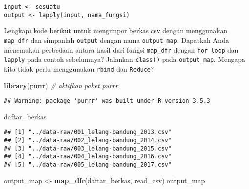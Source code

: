 \documentclass[]{article}
\newenvironment{Shaded}{\begin{snugshade}}{\end{snugshade}}
\newcommand{\CommentTok}[1]{\textcolor[rgb]{0.56,0.35,0.01}{\textit{#1}}}
\newcommand{\KeywordTok}[1]{\textcolor[rgb]{0.13,0.29,0.53}{\textbf{#1}}}
\newcommand{\NormalTok}[1]{#1}
\newcommand{\StringTok}[1]{\textcolor[rgb]{0.31,0.60,0.02}{#1}}
\begin{document}
\begin{verbatim}
input <- sesuatu
output <- lapply(input, nama_fungsi)
\end{verbatim}

Lengkapi kode berikut untuk mengimpor berkas csv dengan menggunakan
\texttt{map\_dfr} dan simpanlah \texttt{output} dengan nama
\texttt{output\_map}. Dapatkah Anda menemukan perbedaan antara hasil
dari fungsi \texttt{map\_dfr} dengan \texttt{for\ loop} dan
\texttt{lapply} pada contoh sebelumnya? Jalankan \texttt{class()} pada
\texttt{output\_map}. Mengapa kita tidak perlu menggunakan
\texttt{rbind} dan \texttt{Reduce}?

\begin{Shaded}
\begin{Highlighting}[]
\KeywordTok{library}\NormalTok{(purrr) }\CommentTok{# aktifkan paket purrr}
\end{Highlighting}
\end{Shaded}

\begin{verbatim}
## Warning: package 'purrr' was built under R version 3.5.3
\end{verbatim}

\begin{Shaded}
\begin{Highlighting}[]
\NormalTok{daftar_berkas}
\end{Highlighting}
\end{Shaded}

\begin{verbatim}
## [1] "../data-raw/001_lelang-bandung_2013.csv"
## [2] "../data-raw/002_lelang-bandung_2014.csv"
## [3] "../data-raw/003_lelang-bandung_2015.csv"
## [4] "../data-raw/004_lelang-bandung_2016.csv"
## [5] "../data-raw/005_lelang-bandung_2017.csv"
\end{verbatim}

\begin{Shaded}
\begin{Highlighting}[]
\NormalTok{output_map <-}\StringTok{ }\KeywordTok{map_dfr}\NormalTok{(daftar_berkas, read_csv)}
\NormalTok{output_map}
\end{Highlighting}
\end{Shaded}
\end{document}
